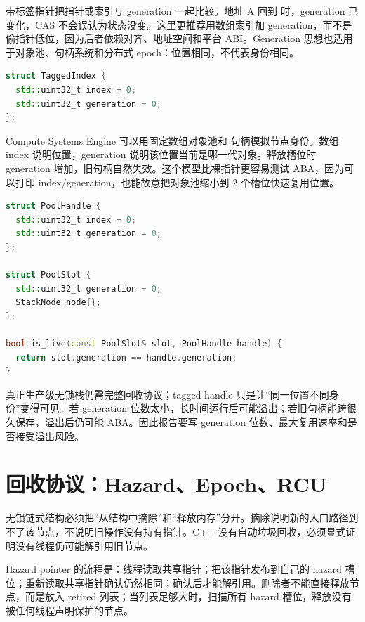 带标签指针把指针或索引与 generation 一起比较。地址 A 回到  时，generation 已变化，CAS 不会误认为状态没变。这里更推荐用数组索引加 generation，而不是偷指针低位，因为后者依赖对齐、地址空间和平台 ABI。Generation 思想也适用于对象池、句柄系统和分布式 epoch：位置相同，不代表身份相同。

\begin{lstlisting}[language=C++,caption={标签句柄的语义形状}]
struct TaggedIndex {
  std::uint32_t index = 0;
  std::uint32_t generation = 0;
};
\end{lstlisting}

Compute Systems Engine 可以用固定数组对象池和  句柄模拟节点身份。数组 index 说明位置，generation 说明该位置当前是哪一代对象。释放槽位时 generation 增加，旧句柄自然失效。这个模型比裸指针更容易测试 ABA，因为可以打印 index/generation，也能故意把对象池缩小到 2 个槽位快速复用位置。

\begin{lstlisting}[language=C++,caption={对象池句柄检查把身份问题显式化}]
struct PoolHandle {
  std::uint32_t index = 0;
  std::uint32_t generation = 0;
};

struct PoolSlot {
  std::uint32_t generation = 0;
  StackNode node{};
};

bool is_live(const PoolSlot& slot, PoolHandle handle) {
  return slot.generation == handle.generation;
}
\end{lstlisting}

真正生产级无锁栈仍需完整回收协议；tagged handle 只是让“同一位置不同身份”变得可见。若 generation 位数太小，长时间运行后可能溢出；若旧句柄能跨很久保存，溢出后仍可能 ABA。因此报告要写 generation 位数、最大复用速率和是否接受溢出风险。

\section{回收协议：Hazard、Epoch、RCU}

无锁链式结构必须把“从结构中摘除”和“释放内存”分开。摘除说明新的入口路径到不了该节点，不说明旧操作没有持有指针。C++ 没有自动垃圾回收，必须显式证明没有线程仍可能解引用旧节点。

Hazard pointer 的流程是：线程读取共享指针；把该指针发布到自己的 hazard 槽位；重新读取共享指针确认仍然相同；确认后才能解引用。删除者不能直接释放节点，而是放入 retired 列表；当列表足够大时，扫描所有 hazard 槽位，释放没有被任何线程声明保护的节点。

